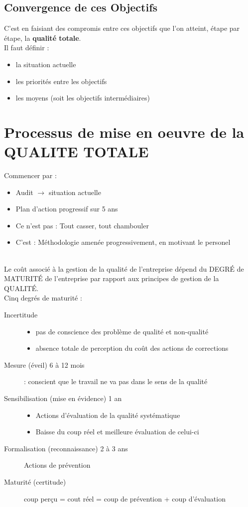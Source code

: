 	\subsection{Convergence de ces Objectifs}
C’est en faisiant des compromis entre ces objectifs que l’on atteint, étape par étape, la \textbf{qualité totale}.\\ 
Il faut définir : 
	\begin{itemize}
	\item la situation actuelle
	\item les priorités entre les objectifs
	\item les moyens (soit les objectifs intermédiaires)
	\end{itemize}


\section{Processus de mise en oeuvre de la QUALITE TOTALE}

Commencer par :
\begin{itemize}
	\item Audit $\rightarrow$ situation actuelle
	\item Plan d'action progressif sur 5 ans
	\item Ce n’est pas : Tout casser, tout chambouler
	\item C’est : Méthodologie amenée progressivement, en motivant le personel
\end{itemize}
\hfill\\

Le coût associé à la gestion de la qualité de l'entreprise dépend du DEGRÉ de MATURITÉ de l'entreprise par rapport aux principes de gestion de la QUALITÉ.\\
Cinq degrés de maturité :
\begin{description}
\item[Incertitude]
	\begin{itemize}
	\item pas de conscience des problème de qualité et non-qualité
	\item absence totale de perception du coût des actions de corrections
	\end{itemize}
\item[Mesure (éveil) 6 à 12 mois] : conscient que le travail ne va pas dans le sens de la qualité
\item[Sensibilisation (mise en évidence) 1 an]
	\begin{itemize}
	\item Actions d’évaluation de la qualité systématique
	\item Baisse du coup réel et meilleure évaluation de celui-ci
	\end{itemize}
\item[Formalisation (reconnaissance) 2 à 3 ans] Actions de prévention
\item[Maturité (certitude)] coup perçu = cout réel = coup de prévention + coup d’évaluation
\end{description}
\hfill\\

